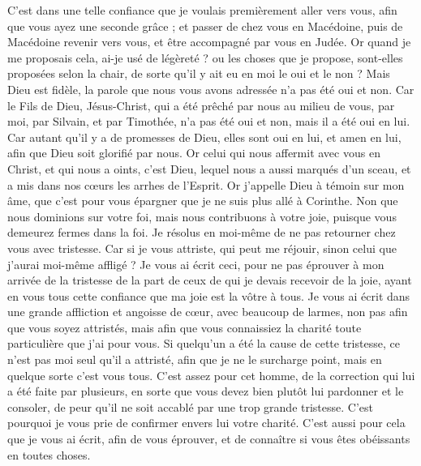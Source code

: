 \begin{multicols}{2}
C’est dans une telle confiance que je voulais premièrement aller vers vous, afin que vous ayez une seconde grâce ;
et passer de chez vous en Macédoine, puis de Macédoine revenir vers vous, et être accompagné par vous en Judée.
Or quand je me proposais cela, ai-je usé de légèreté ? ou les choses  que je propose, sont-elles proposées selon la chair, de sorte qu'il y ait eu en moi le oui et le non ?
Mais Dieu est fidèle, la parole que nous vous avons adressée n’a pas été oui et non.
Car le Fils de Dieu, Jésus-Christ, qui a été prêché par nous au milieu de vous, par moi, par Silvain, et par Timothée, n'a pas été oui et non, mais il a été oui en lui.
Car autant qu’il y a de promesses de Dieu, elles sont oui en lui, et amen en lui, afin que Dieu soit glorifié par nous.
Or celui qui nous affermit avec vous en Christ, et qui nous a oints, c'est Dieu,
lequel nous a aussi marqués d’un sceau, et a mis dans nos cœurs les arrhes de l'Esprit.
Or j'appelle Dieu à témoin sur mon âme, que c’est pour vous épargner que je ne suis plus allé à Corinthe.
Non que nous dominions sur votre foi, mais nous contribuons à votre joie, puisque vous demeurez fermes dans la foi.
\VerseOne{}Je résolus en moi-même de ne pas retourner chez vous avec tristesse.
Car si je vous attriste, qui peut me réjouir, sinon celui que j'aurai moi-même affligé ?
Je vous ai écrit ceci, pour ne pas éprouver à mon arrivée de la tristesse de la part de ceux de qui je devais recevoir de la joie, ayant en vous tous cette confiance que ma joie est la vôtre à tous.
Je vous ai écrit dans une grande affliction et angoisse de cœur, avec beaucoup de larmes, non pas afin que vous soyez attristés, mais afin que vous connaissiez la charité toute particulière que j'ai pour vous.
Si quelqu'un a été la cause de cette tristesse, ce n'est pas moi seul qu'il a attristé, afin que je ne le surcharge point, mais en quelque sorte c'est vous tous.
C'est assez pour cet homme, de la correction qui lui a été faite par plusieurs,
en sorte que vous devez bien plutôt lui pardonner et le consoler, de peur qu’il ne soit accablé par une trop grande tristesse.
C'est pourquoi je vous prie de confirmer envers lui votre charité.
C’est aussi pour cela que je vous ai écrit, afin de vous éprouver, et de connaître si vous êtes obéissants en toutes choses.

\end{multicols}
